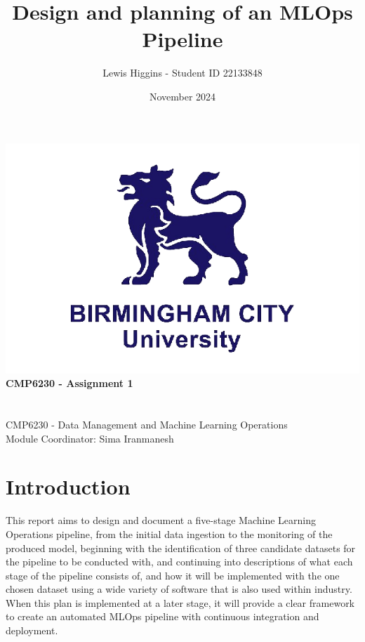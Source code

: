 \documentclass[12pt]{report}
\title{Design and planning of an MLOps Pipeline}
\author{Lewis Higgins - Student ID 22133848}
\date{November 2024}
\begin{document}
\makeatletter
\begin{titlepage}
    \begin{center}
        \includegraphics[width=0.7\linewidth]{BCU}\\[4ex]
        {\huge \bfseries CMP6230 - Assignment 1}\\[2ex]
        {\large \bfseries  \@title}\\[50ex]
        {\@author}\\[2ex]
        {CMP6230 - Data Management and Machine Learning Operations}\\[2ex]
        {Module Coordinator: Sima Iranmanesh}\\[10ex]
    \end{center}
\end{titlepage}
\makeatother
\thispagestyle{empty}
\newpage


\setcounter{page}{0}


\tableofcontents
\thispagestyle{empty}

\chapter*{Introduction}
This report aims to design and document a five-stage Machine Learning Operations pipeline, from the initial 
data ingestion to the monitoring of the produced model, beginning 
with the identification of three candidate datasets for the pipeline to be conducted with, and continuing 
into descriptions of what each stage of the pipeline consists of, and how it will be implemented with the
one chosen dataset using a wide variety of software that is also used within industry. When this plan 
is implemented at a later stage, it will provide a clear framework to create an automated MLOps pipeline
with continuous integration and deployment.
\end{document}
